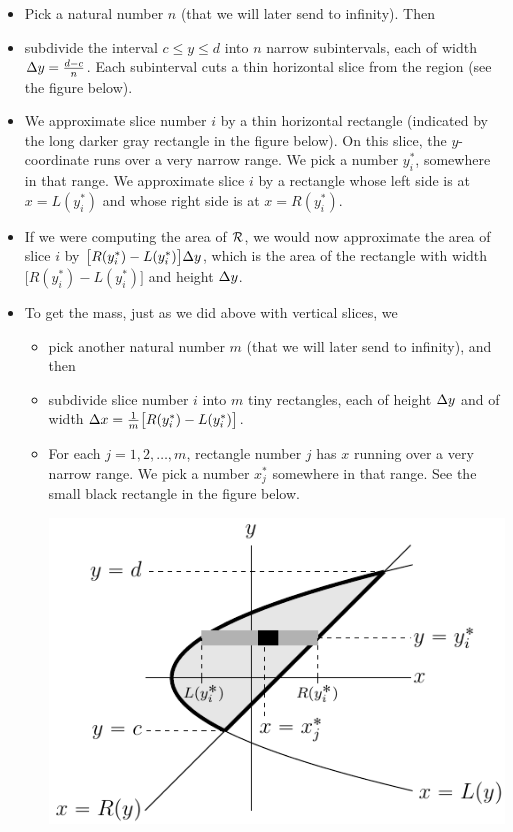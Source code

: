 \begin{itemize}
 \item 
Pick a natural number $n$ (that we will later send to infinity). Then
 \item 
subdivide the interval $c\le y\le d$ into $n$ narrow subintervals, each 
of width $\Delta y=\frac{d-c}{n}$. Each subinterval cuts a thin horizontal 
slice from the region (see the figure below).
 \item We approximate slice number $i$ by a thin horizontal rectangle (indicated by the long darker gray rectangle in the figure below). On this 
slice, the $y$-coordinate runs over a very narrow range. 
We pick a number $y_i^*$, somewhere in that range. We approximate slice 
$i$ by a rectangle whose left side is at $x=L(y_i^*)$ and whose right side 
is at $x=R(y_i^*)$.
\item 
If we were computing the area of $\mathcal{R}$, we would now
approximate the area of slice $i$ by $\big[R(y_i^*)-L(y_i^*)\big]\Delta y$,
which is the area of the rectangle with width $\big[R(y_i^*)-L(y_i^*)\big]$
and height $\Delta y$.
\item
To get the mass, just as we did above with vertical slices, we
\begin{itemize}
\item 
   pick another natural number $m$ (that we will later send to infinity), 
   and then 
\item 
   subdivide slice number $i$ into $m$ tiny rectangles, each of height $\Delta y$ 
and of width $\Delta x=\frac{1}{m}\big[R(y_i^*)-L(y_i^*)\big]$. 
\item 
For each $j=1,2,\dots,m$, rectangle number $j$ has $x$ running over a very narrow range.  We pick a number $x_j^*$ somewhere in that range. 
See the small black rectangle in the figure below.
\begin{efig}
\begin{center}
   \includegraphics{hSliceB.pdf}

\end{center}
\end{efig}
\end{itemize}
\end{itemize}
